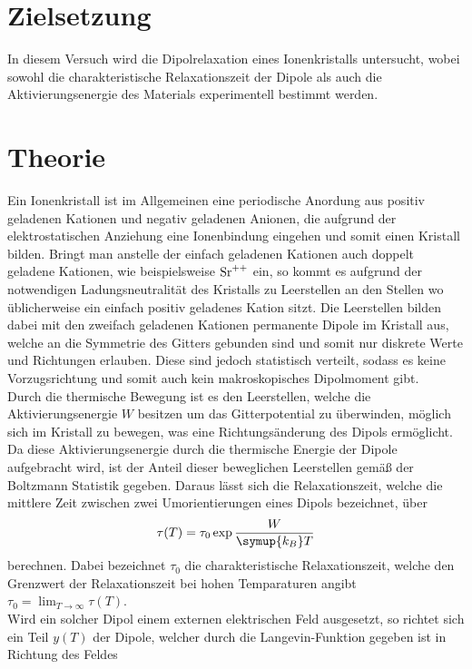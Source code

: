 
\label{sec:Theorie}
\section{Zielsetzung}

In diesem Versuch wird die Dipolrelaxation eines Ionenkristalls untersucht,
wobei sowohl die charakteristische Relaxationszeit der Dipole als
auch die Aktivierungsenergie des Materials experimentell bestimmt werden.

\section{Theorie}
Ein Ionenkristall ist im Allgemeinen eine periodische Anordung aus positiv geladenen
Kationen und negativ geladenen Anionen, die aufgrund der elektrostatischen Anziehung
eine Ionenbindung eingehen und somit einen Kristall bilden. Bringt man anstelle
der einfach geladenen Kationen auch doppelt geladene Kationen, wie beispielsweise
$\ce{Sr^{++}}$ ein, so kommt es aufgrund der notwendigen Ladungsneutralität des Kristalls
zu Leerstellen an den Stellen wo üblicherweise ein einfach positiv geladenes Kation
sitzt. Die Leerstellen bilden dabei mit den zweifach geladenen Kationen permanente
Dipole im Kristall aus, welche an die Symmetrie des Gitters gebunden sind und
somit nur diskrete Werte und Richtungen erlauben. Diese sind jedoch statistisch verteilt,
sodass es keine Vorzugsrichtung und somit auch kein makroskopisches Dipolmoment gibt. \\
Durch die thermische Bewegung ist es den Leerstellen, welche die Aktivierungsenergie
$W$ besitzen um das Gitterpotential zu überwinden, möglich sich im Kristall zu bewegen,
was eine Richtungsänderung des Dipols ermöglicht. Da diese Aktivierungsenergie
durch die thermische Energie der Dipole aufgebracht wird, ist der Anteil dieser
beweglichen Leerstellen gemäß der Boltzmann Statistik gegeben. Daraus
lässt sich die Relaxationszeit, welche die mittlere Zeit zwischen zwei Umorientierungen
eines Dipols bezeichnet, über
\begin{equation}
  \tau(T)=\tau_0\exp{\frac{W}{\symup{k_B}T}}
  \label{eqn:tau}
\end{equation}
berechnen. Dabei bezeichnet $\tau_0$ die charakteristische Relaxationszeit, welche den Grenzwert
der Relaxationszeit bei hohen Temparaturen angibt $\tau_0=\lim_{T \to \infty}\tau(T)$. \\
Wird ein solcher Dipol einem externen elektrischen Feld ausgesetzt, so richtet sich
ein Teil $y(T)$ der Dipole, welcher durch die Langevin-Funktion gegeben ist in Richtung des Feldes
